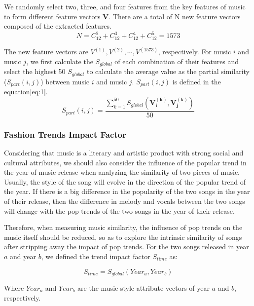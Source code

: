 \documentclass[12pt]{article}  %
\newenvironment{shrinkeq}[1]
{ \bgroup
	\addtolength\abovedisplayshortskip{#1}
	\addtolength\abovedisplayskip{#1}
	\addtolength\belowdisplayshortskip{#1}
	\addtolength\belowdisplayskip{#1}}
{\egroup\ignorespacesafterend}
\begin{document}
We randomly select two, three, and four features from the key features of music to form different feature vectors $\mathbf{V}$. There are a total of N new feature vectors composed of the extracted features. 
 $$N=C_{12}^2+C_{12}^3+C_{12}^4+C_{12}^5=1573$$

The new feature vectors are $V^{(1)}, V^{(2)}, \cdots, V^{(1573)}$, respectively. For music $i$ and music $j$, we first calculate the $S_{global}$ of each combination of their features and select the highest 50 $S_{global}$ to calculate the average value as the partial similarity ($S_{part}(i,j)$) between music $i$ and music $j$. $S_{part}(i,j)$ is defined in the equation\eqref{eq:1}.
\begin{shrinkeq}{-1.5ex}
	\begin{equation}\label{eq:1}
	S_{part}(i,j)=\frac{\sum\limits_{k=1}^{50}S_{global}(\mathbf{V_i^{(k)}},\mathbf{V_j^{(k)}})}{50}
	\end{equation}
\end{shrinkeq}

\subsubsection{Fashion Trends Impact Factor}
Considering that music is a literary and artistic product with strong social and cultural attributes, we should also consider the influence of the popular trend in the year of music release when analyzing the similarity of two pieces of music. Usually, the style of the song will evolve in the direction of the popular trend of the year. If there is a big difference in the popularity of the two songs in the year of their release, then the difference in melody and vocals between the two songs will change with the pop trends of the two songs in the year of their release.

Therefore, when measuring music similarity, the influence of pop trends on the music itself should be reduced, so as to explore the intrinsic similarity of songs after stripping away the impact of pop trends. For the two songs released in year $a$ and year $b$, we defined the trend impact factor $S_{time}$ as:

\begin{shrinkeq}{-1.5ex}
	\begin{equation}
	S_{time}=S_{global}(Year_a,Year_b)
	\end{equation}
\end{shrinkeq}

Where $Year_a$ and $Year_b$ are the music style attribute vectors of year $a$ and $b$, respectively. 
\end{document}
